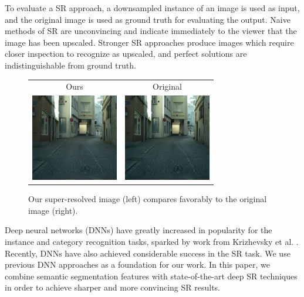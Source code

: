 \documentclass[10pt,twocolumn,letterpaper]{article}
\begin{document}
To evaluate a SR approach, a downsampled instance of an image is used as input,
and the original image is used as ground truth for evaluating the output. Naive
methods of SR are unconvincing and indicate immediately to the viewer that the
image has been upscaled. Stronger SR approaches produce images which require
closer inspection to recognize as upscaled, and perfect solutions are
indistinguishable from ground truth.

\begin{figure}[ht]
    \begin{tabular}{cc}
        Ours & Original \\
        \includegraphics[trim=0 0 0 0, clip,
            width=1.5in]{images/splash_ours.png} &
        \includegraphics[trim=0 0 0 0, clip,
            width=1.5in]{images/splash_gt.png} \\
    \end{tabular}
    \caption{Our super-resolved image (left) compares favorably to the original
    image (right).}
    \label{fig:exampleIntroFirst}
\end{figure}

Deep neural networks (DNNs) have greatly increased in popularity for the
instance and category recognition tasks, sparked by work from Krizhevsky et al.
\cite{AlexNet}. Recently, DNNs have also achieved considerable success in the
SR task. We use previous DNN approaches as a foundation for our work. In this
paper, we combine semantic segmentation features with state-of-the-art deep SR
techniques in order to achieve sharper and more convincing SR results.
\end{document}

